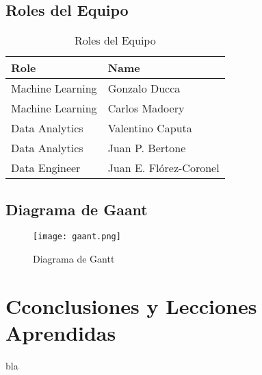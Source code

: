 \documentclass{other/docTemplate}
\begin{document}
\subsection{Roles del Equipo}
\begin{table}[H]
  \centering	
  \caption{Roles del Equipo}
  \begin{tabular}{|p{5cm}|p{10cm}|}
    \hline
    \textbf{Role} & \textbf{Name} \\\hline
    Machine Learning & Gonzalo Ducca \\\hline
    Machine Learning & Carlos Madoery \\\hline
    Data Analytics & Valentino Caputa \\\hline
    Data Analytics & Juan P. Bertone \\\hline
    Data Engineer & Juan E. Flórez-Coronel \\\hline
  \end{tabular}
  \label{tab:teamroles}
\end{table}
\subsection{Diagrama de Gaant}
\begin{figure}[htbp!]
  \texttt{[image: gaant.png]}
  \caption{Diagrama de Gantt}
  \label{fig:gaant}
\end{figure}

\clearpage
\section*{Cconclusiones y Lecciones Aprendidas}

bla

  
\end{document}

